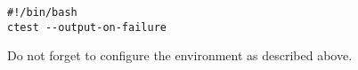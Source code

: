 \documentclass[a4paper,10pt,DIV=12]{scrreprt}
\begin{document}
\vspace{2mm}\hspace{0.2in}\begin{minipage}{0.8\textwidth}
\begin{verbatim}
#!/bin/bash
ctest --output-on-failure
\end{verbatim}
\end{minipage}\vspace{2mm}

\noindent Do not forget to configure the environment as described above.

%
%
%
% 
%
\end{document}
